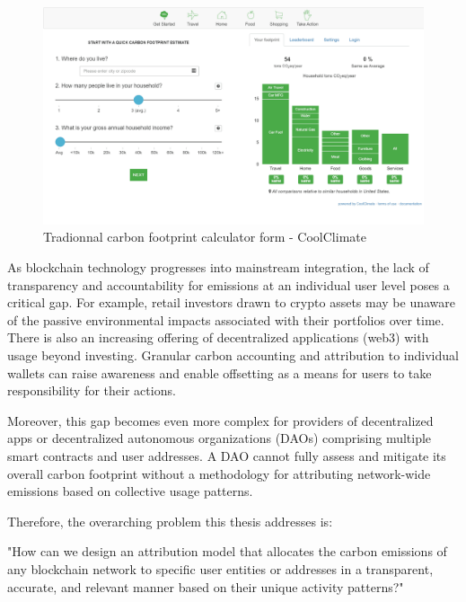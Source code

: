 \documentclass[11pt]{report}
\begin{document}
\begin{figure}[hbt!]
    \centering
    \centerline{\includegraphics[scale=0.25]{figures/carbon_footprint_calculator.png}}
    \caption[YO]{Tradionnal carbon footprint calculator form - CoolClimate\footnotemark}
    \label{fig:carbon_footprint_calculator}
\end{figure}



As blockchain technology progresses into mainstream integration, the lack of transparency and accountability for emissions at an individual user level poses a critical gap. For example, retail investors drawn to crypto assets may be unaware of the passive environmental impacts associated with their portfolios over time. There is also an increasing offering of decentralized applications (web3) with usage beyond investing. Granular carbon accounting and attribution to individual wallets can raise awareness and enable offsetting as a means for users to take responsibility for their actions.

Moreover, this gap becomes even more complex for providers of decentralized apps or decentralized autonomous organizations (DAOs) comprising multiple smart contracts and user addresses. A DAO cannot fully assess and mitigate its overall carbon footprint without a methodology for attributing network-wide emissions based on collective usage patterns.

Therefore, the overarching problem this thesis addresses is:

"How can we design an attribution model that allocates the carbon emissions of any blockchain network to specific user entities or addresses in a transparent, accurate, and relevant manner based on their unique activity patterns?"
\end{document}
